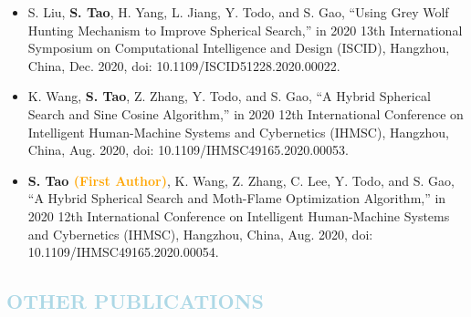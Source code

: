 \documentclass[11pt,a4paper,sans]{moderncv}
\begin{document}
{\begin{itemize}[label=\textbullet]
      \item [3)] S. Liu, \textbf{S. Tao}, H. Yang, L. Jiang, Y. Todo, and S. Gao, “Using Grey Wolf Hunting Mechanism to Improve Spherical Search,” in 2020 13th International Symposium on Computational Intelligence and Design (ISCID), Hangzhou, China, Dec. 2020, doi: 10.1109/ISCID51228.2020.00022.
      
      \item [2)] K. Wang, \textbf{S. Tao}, Z. Zhang, Y. Todo, and S. Gao, “A Hybrid Spherical Search and Sine Cosine Algorithm,” in 2020 12th International Conference on Intelligent Human-Machine Systems and Cybernetics (IHMSC), Hangzhou, China, Aug. 2020, doi: 10.1109/IHMSC49165.2020.00053.
      
      \item [1)] \textbf{S. Tao \textcolor{orange}{(First Author)}}, K. Wang, Z. Zhang, C. Lee, Y. Todo, and S. Gao, “A Hybrid Spherical Search and Moth-Flame Optimization Algorithm,” in 2020 12th International Conference on Intelligent Human-Machine Systems and Cybernetics (IHMSC), Hangzhou, China, Aug. 2020, doi: 10.1109/IHMSC49165.2020.00054.

  \end{itemize}} 

\subsection{\textcolor{lightblue}{OTHER PUBLICATIONS}}
\end{document}
